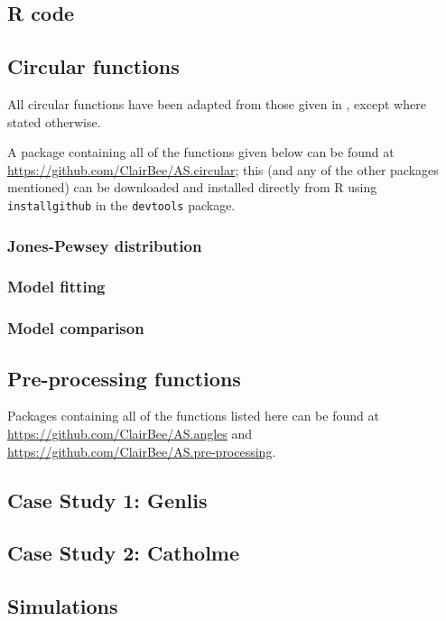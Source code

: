 \documentclass[10pt,fleqn]{article}
\numberwithin{equation}{section}
\begin{document}
\begin{appendix}
\section{R code}

\subsection{Circular functions}

All circular functions have been adapted from those given in \cite{Pewsey2014}, except where stated otherwise. 

A package containing all of the functions given below can be found at \url{https://github.com/ClairBee/AS.circular}; this (and any of the other packages mentioned) can be downloaded and installed directly from R using \texttt{install\textunderscore github} in the \texttt{devtools} package.

\subsubsection{Jones-Pewsey distribution}


\subsubsection{Model fitting}


\subsubsection{Model comparison}


\subsection{Pre-processing functions}
Packages containing all of the functions listed here can be found at \url{https://github.com/ClairBee/AS.angles} and \url{https://github.com/ClairBee/AS.pre-processing}.


\subsection{Case Study 1: Genlis}
\label{app:CS1}


\subsection{Case Study 2: Catholme}
\label{app:CS2}


\subsection{Simulations}


\end{appendix}

\newpage
\printbibliography
\end{document}
